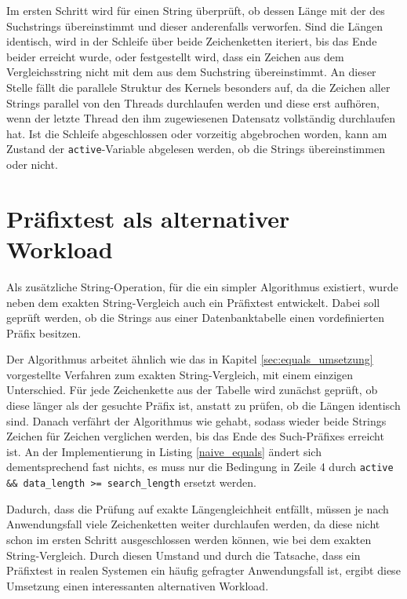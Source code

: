Im ersten Schritt wird für einen String überprüft, ob dessen Länge mit der des Suchstrings übereinstimmt und dieser anderenfalls verworfen.
Sind die Längen identisch, wird in der Schleife über beide Zeichenketten iteriert, bis das Ende beider erreicht wurde, oder festgestellt wird, dass ein Zeichen aus dem Vergleichsstring nicht mit dem aus dem Suchstring übereinstimmt.
An dieser Stelle fällt die parallele Struktur des Kernels besonders auf, da die Zeichen aller Strings parallel von den Threads durchlaufen werden und diese erst aufhören, wenn der letzte Thread den ihm zugewiesenen Datensatz vollständig durchlaufen hat.
Ist die Schleife abgeschlossen oder vorzeitig abgebrochen worden, kann am Zustand der \texttt{active}-Variable abgelesen werden, ob die Strings übereinstimmen oder nicht.

\section{Präfixtest als alternativer Workload}
\label{sec:prefixtest}

Als zusätzliche String-Operation, für die ein simpler Algorithmus existiert, wurde neben dem exakten String-Vergleich auch ein Präfixtest entwickelt.
Dabei soll geprüft werden, ob die Strings aus einer Datenbanktabelle einen vordefinierten Präfix besitzen.

Der Algorithmus arbeitet ähnlich wie das in Kapitel \ref{sec:equals_umsetzung} vorgestellte Verfahren zum exakten String-Vergleich, mit einem einzigen Unterschied.
Für jede Zeichenkette aus der Tabelle wird zunächst geprüft, ob diese länger als der gesuchte Präfix ist, anstatt zu prüfen, ob die Längen identisch sind.
Danach verfährt der Algorithmus wie gehabt, sodass wieder beide Strings Zeichen für Zeichen verglichen werden, bis das Ende des Such-Präfixes erreicht ist.
An der Implementierung in Listing \ref{naive_equals} ändert sich dementsprechend fast nichts, es muss nur die Bedingung in Zeile 4 durch \texttt{active \&\& data\_length >= search\_length} ersetzt werden.

Dadurch, dass die Prüfung auf exakte Längengleichheit entfällt, müssen je nach Anwendungsfall viele Zeichenketten weiter durchlaufen werden, da diese nicht schon im ersten Schritt ausgeschlossen werden können, wie bei dem exakten String-Vergleich.
Durch diesen Umstand und durch die Tatsache, dass ein Präfixtest in realen Systemen ein häufig gefragter Anwendungsfall ist, ergibt diese Umsetzung einen interessanten alternativen Workload.


